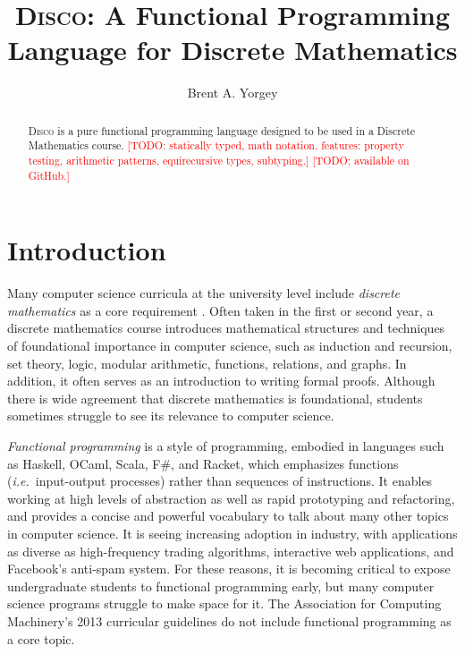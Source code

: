\documentclass[submission,copyright,creativecommons]{eptcs}
\title{\textsc{Disco}: A Functional Programming Language for Discrete Mathematics}
\author{Brent A. Yorgey
\institute{Hendrix College\\ Conway, Arkansas, USA}
\email{yorgey@hendrix.edu}
}
\newcommand{\disco}{\textsc{Disco}\xspace}
\newcommand{\todo}[1]{\textcolor{red}{[TODO: #1]}}
\newcommand{\todo}[1]{}
\begin{document}
\maketitle

\begin{abstract}
  \disco is a pure functional programming language designed to be used
  in a Discrete Mathematics course. \todo{statically typed, math
  notation. features: property testing, arithmetic patterns, equirecursive
  types, subtyping.}
  \todo{available on GitHub.}
\end{abstract}

\section{Introduction}
\label{sec:introduction}

Many computer science curricula at the university level include
\emph{discrete mathematics} as a core requirement \cite{ACM:2013}.
Often taken in the first or second year, a discrete mathematics course
introduces mathematical structures and techniques of foundational
importance in computer science, such as induction and recursion, set
theory, logic, modular arithmetic, functions, relations, and graphs.
In addition, it often serves as an introduction to writing formal
proofs.  Although there is wide agreement that discrete mathematics is
foundational, students sometimes struggle to see its relevance to
computer science.

\emph{Functional programming} is a style of programming, embodied in
languages such as Haskell, OCaml, Scala, F\#, and Racket, which
emphasizes functions (\emph{i.e.}\ input-output processes) rather than
sequences of instructions. It enables working at high levels of
abstraction as well as rapid prototyping and refactoring, and provides
a concise and powerful vocabulary to talk about many other topics in
computer science. It is seeing increasing adoption in industry, with
applications as diverse as high-frequency trading algorithms,
interactive web applications, and Facebook's anti-spam system.  For
these reasons, it is becoming critical to expose undergraduate
students to functional programming early, but many computer science
programs struggle to make space for it.  The Association for Computing
Machinery's 2013 curricular guidelines \cite{ACM:2013} do not include
functional programming as a core topic.
\end{document}
